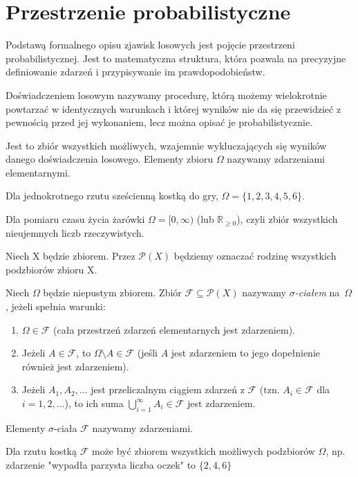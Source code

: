 \documentclass[final,a4paper,openany,12pt]{mwbk}
\begin{document}
\section{Przestrzenie probabilistyczne}

Podstawą formalnego opisu zjawisk losowych jest pojęcie przestrzeni probabilistycznej. Jest to matematyczna struktura, która pozwala na precyzyjne definiowanie zdarzeń i przypisywanie im prawdopodobieństw.

\begin{Def}
Doświadczeniem losowym nazywamy procedurę, którą możemy wielokrotnie powtarzać w identycznych
warunkach i której wyników nie da się przewidzieć z pewnością
przed jej wykonaniem, lecz można opisać je probabilistycznie.
\end{Def}


\begin{Def} Jest to zbiór wszystkich możliwych, wzajemnie wykluczających się wyników danego doświadczenia losowego. Elementy zbioru $\Omega$ nazywamy zdarzeniami elementarnymi.
\end{Def}
\begin{Prz}
    Dla jednokrotnego rzutu sześcienną kostką do gry, $\Omega = \{1, 2, 3, 4, 5, 6\}$.
\end{Prz}
\begin{Prz}
    Dla pomiaru czasu życia żarówki $\Omega = [0, \infty)$ (lub $\mathbb{R}_{\ge 0}$), czyli zbiór wszystkich nieujemnych liczb rzeczywistych.
\end{Prz}

\begin{Ozn}
Niech X będzie zbiorem. Przez $\mathcal{P}(X)$ będziemy oznaczać rodzinę wszystkich podzbiorów zbioru X.
\end{Ozn}

\begin{Def}
Niech $\Omega$ będzie niepustym zbiorem.  Zbiór
$\mathcal{F}\subseteq \mathcal{P}(X)$ nazywamy \emph{$\sigma$-ciałem}
na~$\Omega$, jeżeli spełnia warunki:
    \begin{enumerate}
        \item $\Omega \in \mathcal{F}$ (cała przestrzeń zdarzeń elementarnych jest zdarzeniem).
        \item Jeżeli $A \in \mathcal{F}$, to $\Omega \setminus A \in \mathcal{F}$ (jeśli $A$ jest zdarzeniem to jego dopełnienie również jest zdarzeniem).
        \item Jeżeli $A_1, A_2, \dots$ jest przeliczalnym ciągiem zdarzeń z $\mathcal{F}$ (tzn. $A_i \in \mathcal{F}$ dla $i=1, 2, \dots$), to ich suma $\bigcup_{i=1}^{\infty} A_i \in \mathcal{F}$ jest zdarzeniem.
    \end{enumerate}
    Elementy $\sigma$-ciała $\mathcal{F}$ nazywamy zdarzeniami.
\end{Def}
\begin{Prz}
            Dla rzutu kostką $\mathcal{F}$ może być zbiorem wszystkich możliwych podzbiorów $\Omega$, np. zdarzenie "wypadła parzysta liczba oczek" to $\{2,4,6\}$
\end{Prz}
\end{document}
